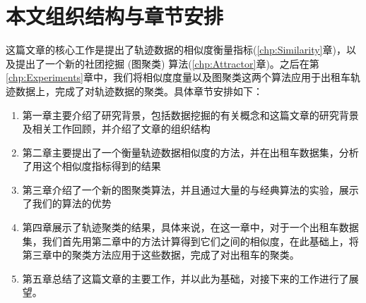 \section{本文组织结构与章节安排}
这篇文章的核心工作是提出了轨迹数据的相似度衡量指标(\ref{chp:Similarity}章)，以及提出了一个新的社团挖掘 (图聚类) 算法(\ref{chp:Attractor}章)。之后在第\ref{chp:Experiments}章中，我们将相似度度量以及图聚类这两个算法应用于出租车轨迹数据上，完成了对轨迹数据的聚类。具体章节安排如下：
\begin{enumerate}
\item \hspace{2mm} 第一章主要介绍了研究背景，包括数据挖掘的有关概念和这篇文章的研究背景及相关工作回顾，并介绍了文章的组织结构
\item \hspace{2mm} 第二章主要提出了一个衡量轨迹数据相似度的方法，并在出租车数据集，分析了用这个相似度指标得到的结果
\item \hspace{2mm} 第三章介绍了一个新的图聚类算法，并且通过大量的与经典算法的实验，展示了我们的算法的优势
\item \hspace{2mm} 第四章展示了轨迹聚类的结果，具体来说，在这一章中，对于一个出租车数据集，我们首先用第二章中的方法计算得到它们之间的相似度，在此基础上，将第三章中的聚类方法应用于这些数据，完成了对出租车的聚类。
\item \hspace{2mm} 第五章总结了这篇文章的主要工作，并以此为基础，对接下来的工作进行了展望。
\end{enumerate}









